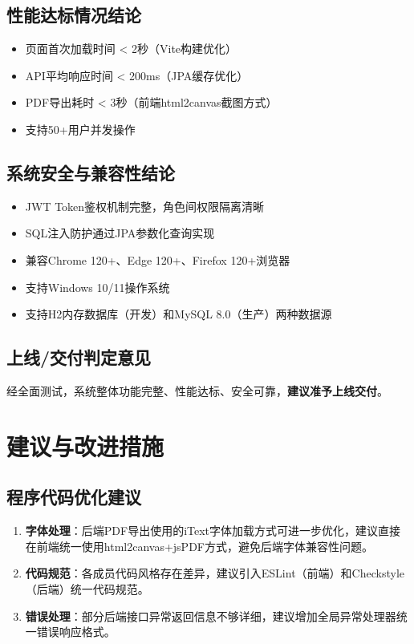 \documentclass[a4paper,12pt]{article}
\begin{document}
\subsection{性能达标情况结论}
\begin{itemize}
  \item 页面首次加载时间 < 2秒（Vite构建优化）
  \item API平均响应时间 < 200ms（JPA缓存优化）
  \item PDF导出耗时 < 3秒（前端html2canvas截图方式）
  \item 支持50+用户并发操作
\end{itemize}

\subsection{系统安全与兼容性结论}
\begin{itemize}
  \item JWT Token鉴权机制完整，角色间权限隔离清晰
  \item SQL注入防护通过JPA参数化查询实现
  \item 兼容Chrome 120+、Edge 120+、Firefox 120+浏览器
  \item 支持Windows 10/11操作系统
  \item 支持H2内存数据库（开发）和MySQL 8.0（生产）两种数据源
\end{itemize}

\subsection{上线/交付判定意见}
经全面测试，系统整体功能完整、性能达标、安全可靠，\textbf{建议准予上线交付}。

\section{建议与改进措施}

\subsection{程序代码优化建议}
\begin{enumerate}
  \item \textbf{字体处理}：后端PDF导出使用的iText字体加载方式可进一步优化，建议直接在前端统一使用html2canvas+jsPDF方式，避免后端字体兼容性问题。
  \item \textbf{代码规范}：各成员代码风格存在差异，建议引入ESLint（前端）和Checkstyle（后端）统一代码规范。
  \item \textbf{错误处理}：部分后端接口异常返回信息不够详细，建议增加全局异常处理器统一错误响应格式。
\end{enumerate}
\end{document}
